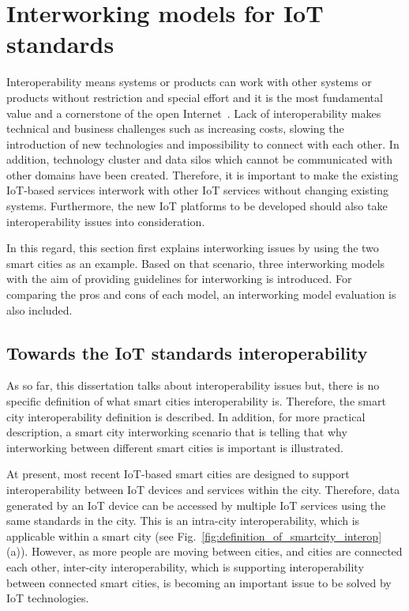\section{Interworking models for IoT standards}  
\label{sec:smartcity_interworking}
Interoperability means systems or products can work with other systems or products without restriction and special effort and it is the most fundamental value and a cornerstone of the open Internet~\cite{rose2015internet}. Lack of interoperability makes technical and business challenges such as increasing costs, slowing the introduction of new technologies and impossibility to connect with each other. In addition, technology cluster and data silos which cannot be communicated with other domains have been created. Therefore, it is important to make the existing IoT-based services interwork with other IoT services without changing existing systems. Furthermore, the new IoT platforms to be developed should also take interoperability issues into consideration. %

In this regard, this section first explains interworking issues by using the two smart cities as an example. Based on that scenario, three interworking models with the aim of providing guidelines for interworking is introduced. For comparing the pros and cons of each model, an interworking model evaluation is also included.

\subsection{Towards the IoT standards interoperability}
As so far, this dissertation talks about interoperability issues but, there is no specific definition of what smart cities interoperability is. Therefore, the smart city interoperability definition is described. In addition, for more practical description, a smart city interworking scenario that is telling that why interworking between different smart cities is important is illustrated.

At present, most recent IoT-based smart cities are designed to support interoperability between IoT devices and services within the city. Therefore, data generated by an IoT device can be accessed by multiple IoT services using the same standards in the city. This is an intra-city interoperability, which is applicable within a smart city (see Fig.~\ref{fig:definition_of_smartcity_interop} (a)). However, as more people are moving between cities, and cities are connected each other, inter-city interoperability, which is supporting interoperability between connected smart cities, is becoming an important issue to be solved by IoT technologies.

